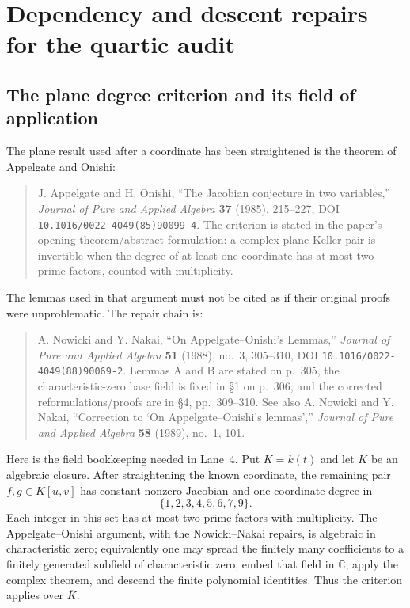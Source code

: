 
\section{Dependency and descent repairs for the quartic audit}

\subsection{The plane degree criterion and its field of application}

The plane result used after a coordinate has been straightened is the theorem
of Appelgate and Onishi:

\begin{quote}
J. Appelgate and H. Onishi, ``The Jacobian conjecture in two variables,''
\emph{Journal of Pure and Applied Algebra} \textbf{37} (1985), 215--227,
DOI \texttt{10.1016/0022-4049(85)90099-4}.  The criterion is stated in the
paper's opening theorem/abstract formulation: a complex plane Keller pair is
invertible when the degree of at least one coordinate has at most two prime
factors, counted with multiplicity.
\end{quote}

The lemmas used in that argument must not be cited as if their original proofs
were unproblematic.  The repair chain is:

\begin{quote}
A. Nowicki and Y. Nakai, ``On Appelgate--Onishi's Lemmas,''
\emph{Journal of Pure and Applied Algebra} \textbf{51} (1988), no.~3,
305--310, DOI \texttt{10.1016/0022-4049(88)90069-2}.  Lemmas A and B are
stated on p.~305, the characteristic-zero base field is fixed in \S1 on
p.~306, and the corrected reformulations/proofs are in \S4, pp.~309--310.
See also A. Nowicki and Y. Nakai, ``Correction to `On Appelgate--Onishi's
lemmas','' \emph{Journal of Pure and Applied Algebra} \textbf{58} (1989),
no.~1, 101.
\end{quote}

Here is the field bookkeeping needed in Lane~4.  Put $K=k(t)$ and let
$\overline K$ be an algebraic closure.  After straightening the known
coordinate, the remaining pair $f,g\in\overline K[u,v]$ has constant nonzero
Jacobian and one coordinate degree in
\[
\{1,2,3,4,5,6,7,9\}.
\]
Each integer in this set has at most two prime factors with multiplicity.
The Appelgate--Onishi argument, with the Nowicki--Nakai repairs, is algebraic
in characteristic zero; equivalently one may spread the finitely many
coefficients to a finitely generated subfield of characteristic zero, embed
that field in $\mathbb C$, apply the complex theorem, and descend the finite
polynomial identities.  Thus the criterion applies over $\overline K$.

